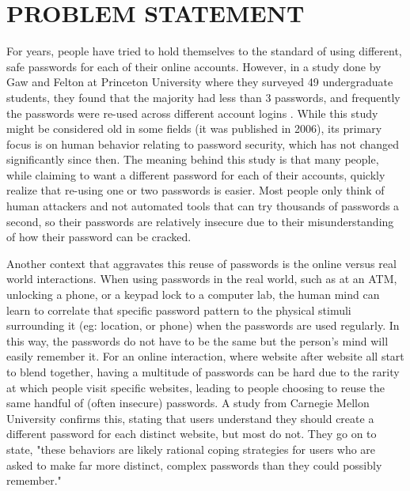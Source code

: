 \documentclass[12pt]{article}
\begin{document}
\section{PROBLEM STATEMENT}

For years, people have tried to hold themselves to the standard of using different, safe passwords for each of their online accounts. However, in a study done by Gaw and Felton at Princeton University where they surveyed 49 undergraduate students, they found that the majority had less than 3 passwords, and frequently the passwords were re-used across different account logins \cite{passw-strats}. While this study might be considered old in some fields (it was published in 2006), its primary focus is on human behavior relating to password security, which has not changed significantly since then. The meaning behind this study is that many people, while claiming to want a different password for each of their accounts, quickly realize that re-using one or two passwords is easier. Most people only think of human attackers and not automated tools that can try thousands of passwords a second, so their passwords are relatively insecure due to their misunderstanding of how their password can be cracked\cite{passw-strats}.

Another context that aggravates this reuse of passwords is the online versus real world interactions. When using passwords in the real world, such as at an ATM, unlocking a phone, or a keypad lock to a computer lab, the human mind can learn to correlate that specific password pattern to the physical stimuli surrounding it (eg: location, or phone) when the passwords are used regularly. In this way, the passwords do not have to be the same but the person's mind will easily remember it. For an online interaction, where website after website all start to blend together, having a multitude of passwords can be hard due to the rarity at which people visit specific websites, leading to people choosing to reuse the same handful of (often insecure) passwords\cite{passw-strats}. A study from Carnegie Mellon University confirms this, stating that users understand they should create a different password for each distinct website, but most do not. They go on to state, "these behaviors are likely rational coping strategies for users who are asked to make far more distinct, complex passwords than they could possibly remember." \cite{user-percept}
\end{document}
